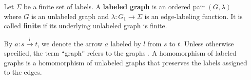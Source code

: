 \begin{definition}
    \label{def:graph}
    Let \(\Sigma\) be a finite set of labels. A \textbf{labeled graph} is an ordered pair \((G,\lambda)\) where \( G \) is an unlabeled graph and \( \lambda : G_1 \mathop{\rightarrow} \Sigma\) is an edge-labeling function. 
    It is called \textbf{finite} if its underlying unlabeled graph is finite.  
\end{definition}
By $a : s\overset{l}{\rightarrow} t$, we denote the arrow $a$ labeled by $l$ from $s$ to $t$. Unless otherwise specified, the term \enquote{graph} refers to the graphs .  A homomorphism of labeled graphs is a homomorphism of unlabeled graphs that preserves the labels assigned to the edges.